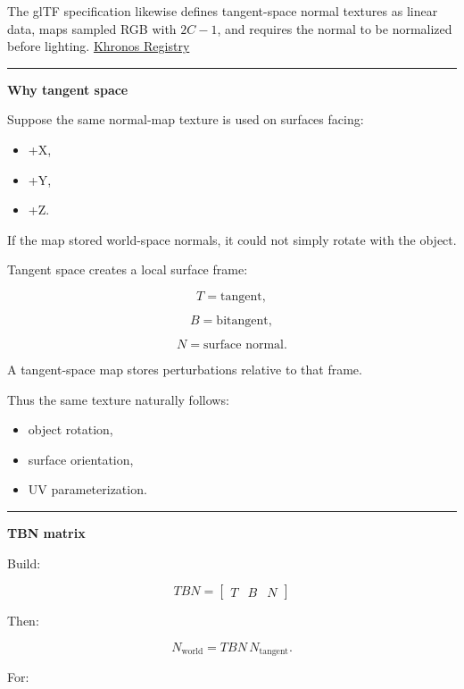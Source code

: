 The glTF specification likewise defines tangent-space normal textures as linear data, maps sampled RGB with \(2C-1\), and requires the normal to be normalized before lighting. \href{https://registry.khronos.org/glTF/specs/2.0/glTF-2.0.html?utm_source=chatgpt.com}{Khronos Registry}

\begin{center}\rule{0.5\linewidth}{0.5pt}\end{center}

\textbf{Why tangent space}

Suppose the same normal-map texture is used on surfaces facing:

\begin{itemize}
\tightlist
\item
  +X,
\item
  +Y,
\item
  +Z.
\end{itemize}

If the map stored world-space normals, it could not simply rotate with the object.

Tangent space creates a local surface frame:

\[
T=\text{tangent},
\]

\[
B=\text{bitangent},
\]

\[
N=\text{surface normal}.
\]

A tangent-space map stores perturbations relative to that frame.

Thus the same texture naturally follows:

\begin{itemize}
\tightlist
\item
  object rotation,
\item
  surface orientation,
\item
  UV parameterization.
\end{itemize}

\begin{center}\rule{0.5\linewidth}{0.5pt}\end{center}

\textbf{TBN matrix}

Build:

\[
\boxed{
TBN=
\begin{bmatrix}
T&B&N
\end{bmatrix}
}
\]

Then:

\[
\boxed{
N_{\text{world}}
=
TBN\,N_{\text{tangent}}.
}
\]

For:

